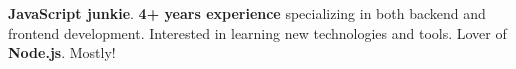 

\begin{cvparagraph}

\textbf{JavaScript junkie}. \textbf{4+ years experience} specializing in both backend and frontend development. Interested in learning new technologies and tools. Lover of \textbf{Node.js}. Mostly!
\end{cvparagraph}
